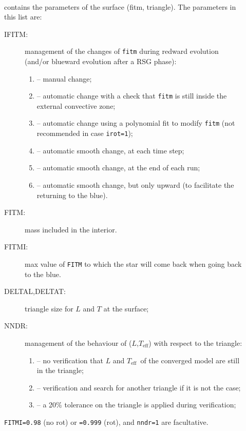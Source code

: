 \documentclass[11pt]{article}
\def\teff{\ensuremath{T_\text{eff}}}
\begin{document}
\begin{description}
  \item[] ~\\ contains the parameters of the surface (fitm, triangle). The parameters in this list are:
    \begin{description}
     \item[IFITM:] management of the changes of {\tt fitm} during redward evolution (and/or blueward evolution after a RSG phase):
        \begin{enumerate}[labelindent=.5cm,font=\ttfamily \bfseries,label=\arabic*]
          \item[0] -- manual change;
          \item[1] -- automatic change with a check that {\tt fitm} is still inside the external convective zone;
          \item[2] -- automatic change using a polynomial fit to modify {\tt fitm} (not recommended in case \texttt{irot=1});
          \item[3] -- automatic smooth change, at each time step;
          \item[4] -- automatic smooth change, at the end of each run;
          \item[5] -- automatic smooth change, but only upward (to facilitate the returning to the blue).
        \end{enumerate}
      \item[FITM:] mass included in the interior.
      \item[FITMI:] max value of \texttt{FITM} to which the star will come back when going back to the blue.
      \item[DELTAL,DELTAT:] triangle size for $L$ and $T$ at the surface;
      \item[NNDR:] management of the behaviour of ($L$,\teff) with respect to the triangle:
        \begin{enumerate}[labelindent=.5cm,font=\ttfamily \bfseries,label=\arabic*]
          \item[0] -- no verification that $L$ and \teff\ of the converged model are still in the triangle;
          \item[1] -- verification and search for another triangle if it is not the case;
          \item[2] -- a 20\% tolerance on the triangle is applied during verification;
        \end{enumerate}
    \end{description}
    \texttt{FITMI=0.98} (no rot) or \texttt{=0.999} (rot), and \texttt{nndr=1} are facultative.


\end{description}
\end{document}
